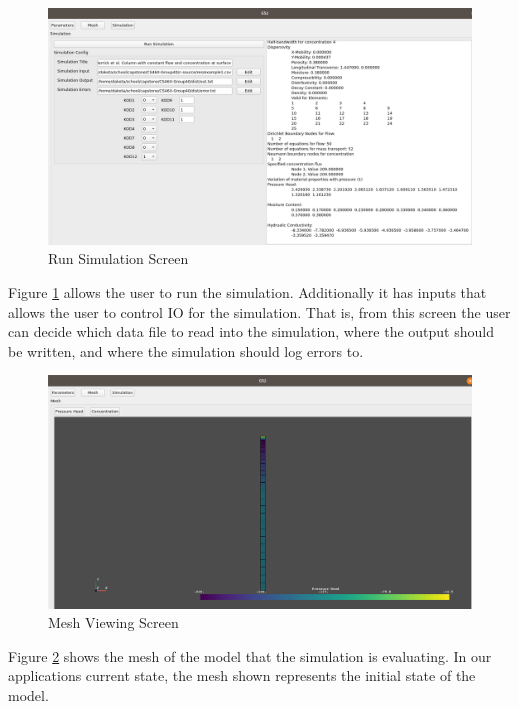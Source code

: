 \documentclass[onecolumn, draftclsnofoot,10pt, compsoc]{IEEEtran}
\begin{document}
\begin{figure}[H]
    \centering
    \includegraphics[scale=0.3]{run-sim-page.png}
    \caption{Run Simulation Screen}
    \label{fig:run-sim}
\end{figure}{}
Figure \ref{fig:run-sim} allows the user to run the simulation. Additionally it has inputs that allows the user to control IO for the simulation. That is, from this screen the user can decide which data file to read into the simulation, where the output should be written, and where the simulation should log errors to.
\begin{figure}[H]
    \centering
    \includegraphics[scale=0.3]{mesh-screen.png}
    \caption{Mesh Viewing Screen}
    \label{fig:mesh-screen}
\end{figure}{}
Figure \ref{fig:mesh-screen} shows the mesh of the model that the simulation is evaluating. In our applications current state, the mesh shown represents the initial state of the model.
\end{document}
